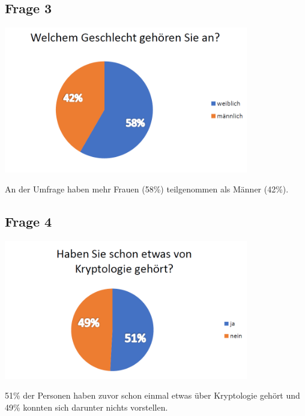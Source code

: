\subsection{Frage 3}
\begin{center}
	\includegraphics[width=0.8\textwidth]{./img/umfrage3}
\end{center}
An der Umfrage haben mehr Frauen (58\%) teilgenommen als Männer (42\%).

\subsection{Frage 4}
\begin{center}
	\includegraphics[width=0.8\textwidth]{./img/umfrage4}
\end{center}
51\% der Personen haben zuvor schon einmal etwas über Kryptologie gehört und 49\% konnten sich darunter nichts vorstellen.

